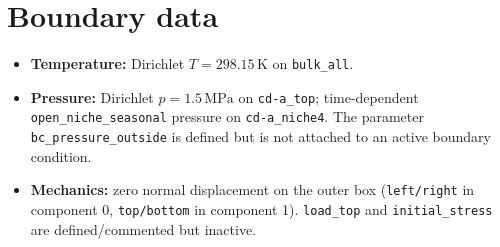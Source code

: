\documentclass[10pt,a4paper]{article}
\newcommand{\TT}{T}
\begin{document}
\section{Boundary data}
\begin{itemize}[leftmargin=1.2em]
  \item \textbf{Temperature:} Dirichlet \( \TT=298.15\,\mathrm{K}\) on \texttt{bulk\_all}.
  \item \textbf{Pressure:} Dirichlet \(p=1.5\,\mathrm{MPa}\) on \texttt{cd-a\_top};
  time-dependent \texttt{open\_niche\_seasonal} pressure on \texttt{cd-a\_niche4}.
  The parameter \texttt{bc\_pressure\_outside} is defined but is not attached to an
  active boundary condition.
  \item \textbf{Mechanics:} zero normal displacement on the outer box
  (\texttt{left/right} in component 0, \texttt{top/bottom} in component 1).
  \texttt{load\_top} and \texttt{initial\_stress} are defined/commented but inactive.
\end{itemize}
\end{document}
